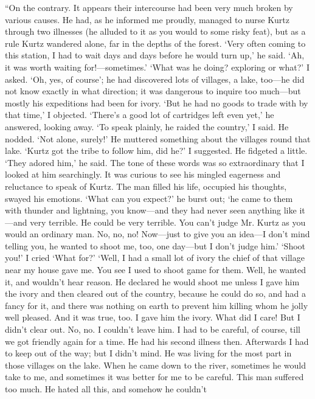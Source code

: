 \documentclass[12pt]{report}
\begin{document}
``On the contrary. It appears their intercourse had been very much
broken by various causes. He had, as he informed me proudly, managed to
nurse Kurtz through two illnesses (he alluded to it as you would to some
risky feat), but as a rule Kurtz wandered alone, far in the depths of
the forest. `Very often coming to this station, I had to wait days and
days before he would turn up,' he said. `Ah, it was worth waiting
for!---sometimes.' `What was he doing? exploring or what?' I asked. `Oh,
yes, of course'; he had discovered lots of villages, a lake, too---he
did not know exactly in what direction; it was dangerous to inquire too
much---but mostly his expeditions had been for ivory. `But he had no
goods to trade with by that time,' I objected. `There's a good lot of
cartridges left even yet,' he answered, looking away. `To speak plainly,
he raided the country,' I said. He nodded. `Not alone, surely!' He
muttered something about the villages round that lake. `Kurtz got the
tribe to follow him, did he?' I suggested. He fidgeted a little. `They
adored him,' he said. The tone of these words was so extraordinary that
I looked at him searchingly. It was curious to see his mingled eagerness
and reluctance to speak of Kurtz. The man filled his life, occupied his
thoughts, swayed his emotions. `What can you expect?' he burst out; `he
came to them with thunder and lightning, you know---and they had never
seen anything like it---and very terrible. He could be very terrible.
You can't judge Mr. Kurtz as you would an ordinary man. No, no, no!
Now---just to give you an idea---I don't mind telling you, he wanted to
shoot me, too, one day---but I don't judge him.' `Shoot you!' I cried
`What for?' `Well, I had a small lot of ivory the chief of that village
near my house gave me. You see I used to shoot game for them. Well, he
wanted it, and wouldn't hear reason. He declared he would shoot me
unless I gave him the ivory and then cleared out of the country, because
he could do so, and had a fancy for it, and there was nothing on earth
to prevent him killing whom he jolly well pleased. And it was true, too.
I gave him the ivory. What did I care! But I didn't clear out. No, no. I
couldn't leave him. I had to be careful, of course, till we got friendly
again for a time. He had his second illness then. Afterwards I had to
keep out of the way; but I didn't mind. He was living for the most part
in those villages on the lake. When he came down to the river, sometimes
he would take to me, and sometimes it was better for me to be careful.
This man suffered too much. He hated all this, and somehow he couldn't
\end{document}
